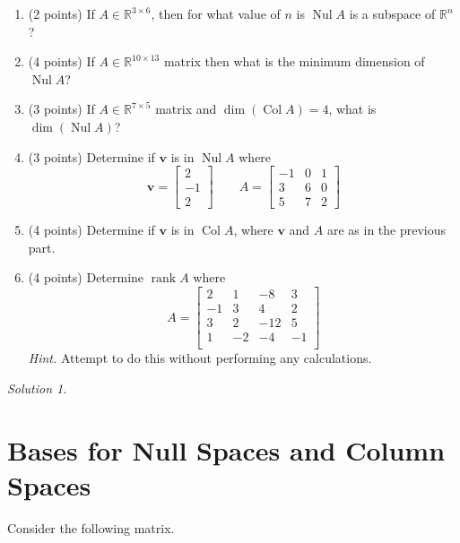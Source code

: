 \documentclass{article}
\theoremstyle{remark}
\newtheorem*{solution}{Solution}
\newcommand{\vv}[1]{\mathbf{#1}}
\newcommand{\R}{\mathbb R}
\DeclareMathOperator{\col}{Col}
\DeclareMathOperator{\nul}{Nul}
\DeclareMathOperator{\rank}{rank}
\begin{document}
\begin{enumerate}
\item (2 points) If $A \in \R^{3 \times 6}$, then for what value of $n$ is $\nul A$ is a subspace of $\R^n$?
\item (4 points) If $A \in \R^{10 \times 13}$ matrix then what is the minimum dimension of $\nul A$?
\item (3 points) If $A \in \R^{7 \times 5}$ matrix and $\dim(\col A) = 4$, what is $\dim(\nul A)$?

\item (3 points) Determine if $\vv v$ is in $\nul A$ where
  \begin{displaymath}
    \vv v =
    \begin{bmatrix}
      2 \\ -1 \\ 2
    \end{bmatrix}
    \qquad
    A =
    \begin{bmatrix}
      -1 & 0 & 1 \\
      3 & 6 & 0\\
      5 & 7 & 2
    \end{bmatrix}
  \end{displaymath}
\item (4 points) Determine if $\vv v$ is in $\col A$, where $\vv v$ and $A$ are as in the previous part.
\item (4 points) Determine $\rank A$ where
  \begin{displaymath}
    A =
    \begin{bmatrix}
      2&1&-8&3\\
      -1&3&4&2\\
      3&2&-12&5\\
      1&-2&-4&-1\\
    \end{bmatrix}
  \end{displaymath}
  \textit{Hint.} Attempt to do this without performing any calculations.
\end{enumerate}

\medskip

\begin{solution}
\end{solution}

\pagebreak
\section{Bases for Null Spaces and Column Spaces}

Consider the following matrix.
\end{document}
